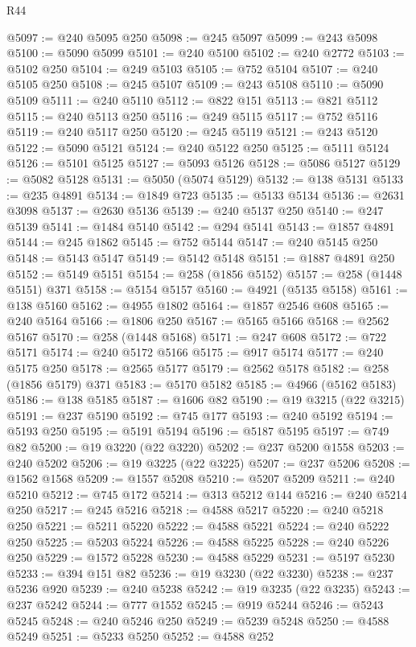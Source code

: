 \begin{lexlean}{R44}
\begin{coremodule}
{@5097 := @240 @5095 @250
@5098 := @245 @5097
@5099 := @243 @5098
@5100 := @5090 @5099
@5101 := @240 @5100
@5102 := @240 @2772
@5103 := @5102 @250
@5104 := @249 @5103
@5105 := @752 @5104
@5107 := @240 @5105 @250
@5108 := @245 @5107
@5109 := @243 @5108
@5110 := @5090 @5109
@5111 := @240 @5110
@5112 := @822 @151
@5113 := @821 @5112
@5115 := @240 @5113 @250
@5116 := @249 @5115
@5117 := @752 @5116
@5119 := @240 @5117 @250
@5120 := @245 @5119
@5121 := @243 @5120
@5122 := @5090 @5121
@5124 := @240 @5122 @250
@5125 := @5111 @5124
@5126 := @5101 @5125
@5127 := @5093 @5126
@5128 := @5086 @5127
@5129 := @5082 @5128
@5131 := @5050 (@5074 @5129)
@5132 := @138 @5131
@5133 := @235 @4891
@5134 := @1849 @723
@5135 := @5133 @5134
@5136 := @2631 @3098
@5137 := @2630 @5136
@5139 := @240 @5137 @250
@5140 := @247 @5139
@5141 := @1484 @5140
@5142 := @294 @5141
@5143 := @1857 @4891
@5144 := @245 @1862
@5145 := @752 @5144
@5147 := @240 @5145 @250
@5148 := @5143 @5147
@5149 := @5142 @5148
@5151 := @1887 @4891 @250
@5152 := @5149 @5151
@5154 := @258 (@1856 @5152)
@5157 := @258 (@1448 @5151) @371
@5158 := @5154 @5157
@5160 := @4921 (@5135 @5158)
@5161 := @138 @5160
@5162 := @4955 @1802
@5164 := @1857 @2546 @608
@5165 := @240 @5164
@5166 := @1806 @250
@5167 := @5165 @5166
@5168 := @2562 @5167
@5170 := @258 (@1448 @5168)
@5171 := @247 @608
@5172 := @722 @5171
@5174 := @240 @5172 @5166
@5175 := @917 @5174
@5177 := @240 @5175 @250
@5178 := @2565 @5177
@5179 := @2562 @5178
@5182 := @258 (@1856 @5179) @371
@5183 := @5170 @5182
@5185 := @4966 (@5162 @5183)
@5186 := @138 @5185
@5187 := @1606 @82
@5190 := @19 @3215 (@22 @3215)
@5191 := @237 @5190
@5192 := @745 @177
@5193 := @240 @5192
@5194 := @5193 @250
@5195 := @5191 @5194
@5196 := @5187 @5195
@5197 := @749 @82
@5200 := @19 @3220 (@22 @3220)
@5202 := @237 @5200 @1558
@5203 := @240 @5202
@5206 := @19 @3225 (@22 @3225)
@5207 := @237 @5206
@5208 := @1562 @1568
@5209 := @1557 @5208
@5210 := @5207 @5209
@5211 := @240 @5210
@5212 := @745 @172
@5214 := @313 @5212 @144
@5216 := @240 @5214 @250
@5217 := @245 @5216
@5218 := @4588 @5217
@5220 := @240 @5218 @250
@5221 := @5211 @5220
@5222 := @4588 @5221
@5224 := @240 @5222 @250
@5225 := @5203 @5224
@5226 := @4588 @5225
@5228 := @240 @5226 @250
@5229 := @1572 @5228
@5230 := @4588 @5229
@5231 := @5197 @5230
@5233 := @394 @151 @82
@5236 := @19 @3230 (@22 @3230)
@5238 := @237 @5236 @920
@5239 := @240 @5238
@5242 := @19 @3235 (@22 @3235)
@5243 := @237 @5242
@5244 := @777 @1552
@5245 := @919 @5244
@5246 := @5243 @5245
@5248 := @240 @5246 @250
@5249 := @5239 @5248
@5250 := @4588 @5249
@5251 := @5233 @5250
@5252 := @4588 @252
}
\end{coremodule}
\end{lexlean}
